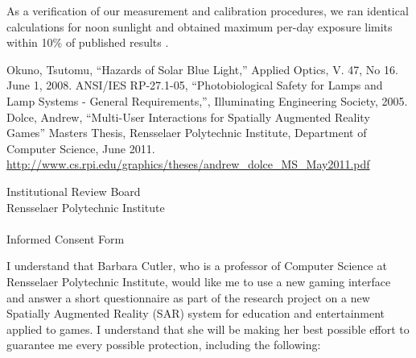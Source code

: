 \documentclass[10pt]{article}
\begin{document}
As a verification of our measurement and calibration procedures, we
ran identical calculations for noon sunlight and obtained maximum
per-day exposure limits within 10\% of published results
\cite{Okuno08}.








\begin{thebibliography}{widest entry}
   Okuno, Tsutomu, ``Hazards of Solar Blue Light,'' Applied Optics, V. 47,
    No 16. June 1, 2008.
   ANSI/IES RP-27.1-05, ``Photobiological Safety for Lamps and Lamp Systems -
 General Requirements,'', Illuminating Engineering Society, 2005.
Dolce, Andrew, 
``Multi-User Interactions for Spatially Augmented Reality Games''
Masters Thesis, Rensselaer Polytechnic Institute, 
Department of Computer Science,
June 2011.
\url{http://www.cs.rpi.edu/graphics/theses/andrew_dolce_MS_May2011.pdf}
\end{thebibliography}



\newpage

\pagestyle{empty}

\begin{center}
{\Large {
Institutional Review Board \\ \vspace{0.1in}
Rensselaer Polytechnic Institute} }\\
\ \\
{\large Informed Consent Form}
\end{center}

\noindent
I understand that Barbara Cutler, who is a professor of Computer
Science at Rensselaer Polytechnic Institute, would like me to use a
new gaming interface and answer a short questionnaire as part of the
research project on a new Spatially Augmented Reality (SAR) system for
education and entertainment applied to games.  I understand that she
will be making her best possible effort to guarantee me every possible
protection, including the following:
\end{document}
